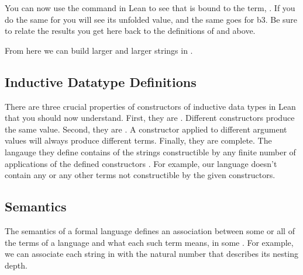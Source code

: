\documentclass[letterpaper,10pt,english]{sphinxmanual}
\begin{document}
\begin{sphinxVerbatim}[commandchars=\\\{\}]
 
\end{sphinxVerbatim}

\sphinxAtStartPar
You can now use the  command in Lean to see that  is
bound to the term, . If
you do the same for  you will see its unfolded value, and the
same goes for b3. Be sure to relate the results you get here back
to the definitions of  and  above.

\begin{sphinxVerbatim}[commandchars=\\\{\}]
 
 
 
\end{sphinxVerbatim}

\sphinxAtStartPar
From here we can build larger and larger strings in .


\subsection{Inductive Datatype Definitions}
\label{\detokenize{A_01_Propositional_Logic:inductive-datatype-definitions}}
\sphinxAtStartPar
There are three crucial properties of constructors of inductive
data types in Lean that you should now understand. First, they
are . Different constructors  produce the same
value. Second, they are . A constructor applied to
different argument values will always produce different terms.
Finally, they are complete. The langauge they define contains
 of the strings constructible by any finite number of
applications of the defined constructors .
For example, our  language doesn’t contain any  or
any other terms not constructible by the given constructors.


\subsection{Semantics}
\label{\detokenize{A_01_Propositional_Logic:semantics}}
\sphinxAtStartPar
The semantics of a formal language defines an association
between some or all of the terms of a language and what each
such term means, in some . For example, we
can associate each string in  with the natural number
that describes its nesting depth.
\end{document}
